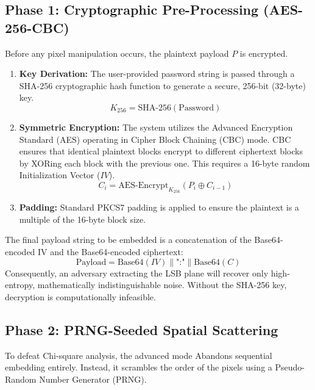 \documentclass[12pt,a4paper]{report}
\begin{document}
\subsection{Phase 1: Cryptographic Pre-Processing (AES-256-CBC)}
Before any pixel manipulation occurs, the plaintext payload $P$ is encrypted. 
\begin{enumerate}
    \item \textbf{Key Derivation:} The user-provided password string is passed through a SHA-256 cryptographic hash function to generate a secure, 256-bit (32-byte) key.
    $$ K_{256} = \text{SHA-256}(\text{Password}) $$
    \item \textbf{Symmetric Encryption:} The system utilizes the Advanced Encryption Standard (AES) operating in Cipher Block Chaining (CBC) mode. CBC ensures that identical plaintext blocks encrypt to different ciphertext blocks by XORing each block with the previous one. This requires a 16-byte random Initialization Vector ($IV$).
    $$ C_i = \text{AES-Encrypt}_{K_{256}}(P_i \oplus C_{i-1}) $$
    \item \textbf{Padding:} Standard PKCS7 padding is applied to ensure the plaintext is a multiple of the 16-byte block size.
\end{enumerate}
The final payload string to be embedded is a concatenation of the Base64-encoded IV and the Base64-encoded ciphertext:
$$ \text{Payload} = \text{Base64}(IV) \parallel \text{":"} \parallel \text{Base64}(C) $$
Consequently, an adversary extracting the LSB plane will recover only high-entropy, mathematically indistinguishable noise. Without the SHA-256 key, decryption is computationally infeasible.

\subsection{Phase 2: PRNG-Seeded Spatial Scattering}
To defeat Chi-square analysis, the advanced mode Abandons sequential embedding entirely. Instead, it scrambles the order of the pixels using a Pseudo-Random Number Generator (PRNG). 
\end{document}
